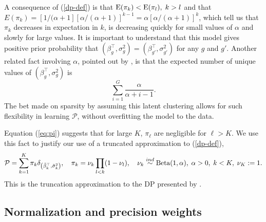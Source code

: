 A consequence of (\ref{dp-def}) is that $\operatorname{E}(\pi_k)<\operatorname{E}(\pi_l),\;k>l$ and that $E(\pi_k)=\left[1/(\alpha+1\right]\left[\alpha/(\alpha+1)\right]^{k-1} = \alpha \left[\alpha/(\alpha+1)\right]^{k}$, which tell us that $\pi_k$ decreases in expectation in $k$, is decreasing quickly for small values of $\alpha$ and slowly for large values. It is important to understand that this model gives positive prior probability that $(\beta_g^\top,\sigma_g^2)=(\beta_{g'}^\top,\sigma_{g'}^2)$ for any $g$ and $g'$. Another related fact involving $\alpha$, pointed out by \citet[p. 1161]{antoniak}, is that the expected number of unique values of $(\beta_g^\top,\sigma^2_g)$ is 
\begin{equation}
\label{exp-num-clust}
\sum_{i=1}^G \frac{\alpha}{\alpha + i - 1}.
\end{equation}  The bet made on sparsity by assuming this latent clustering allows for such flexibility in learning $\mathcal{P}$, without overfitting the model to the data.

Equation (\ref{eq:pi}) suggests that for large $K$, $\pi_\ell$ are negligible for $\ell>K$. We use this fact to justify our use of a truncated approximation to (\ref{dp-def}),
\begin{equation}
\label{trunc-dp-def}
\mathcal{P} =\sum_{k=1}^K \pi_k \delta_{\left(\tilde{\beta}_k^\top ,\tilde{\sigma}^2_k\right)},\quad \pi_k = \nu_k \prod_{l<k}(1-\nu_l), \quad 
\nu_k \stackrel{ind}{\sim} \operatorname{Beta}(1, \alpha),\; \alpha>0,\; k<K,\; \nu_K:=1.
\end{equation}
This is the truncation approximation to the DP presented by \citet{ishwaran2000}.
%
%
%

\subsection{Normalization and precision weights}
\label{norm-weight}
